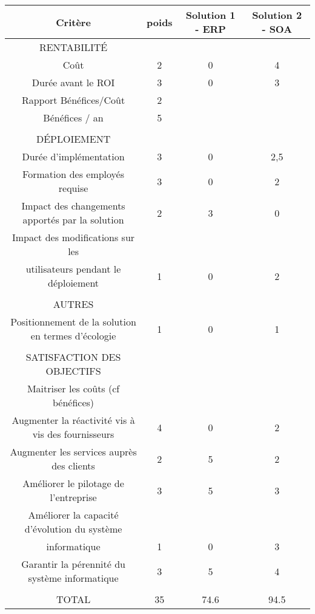 \begin{tabular}{|c|c|c|c|} 
\hline
\rowcolor{EnTete} Critère & poids & Solution 1 - ERP & Solution 2 - SOA \\ \hline
\rowcolor{Activite} RENTABILITÉ &  &  & \\ \hline
Coût & 2 & 0 & 4 \\ \hline
Durée avant le ROI & 3 & 0 & 3 \\ \hline
Rapport Bénéfices/Coût & 2 &  &  \\ \hline
Bénéfices / an & 5 &  &  \\ \hline
 &  &  &  \\ \hline
\rowcolor{Activite} DÉPLOIEMENT &  &  &  \\ \hline
Durée d'implémentation & 3 & 0 & 2,5  \\ \hline
Formation des employés requise & 3 & 0 & 2 \\ \hline
Impact des changements apportés par la solution & 2 & 3 & 0 \\ \hline
Impact des modifications sur les &  &  &  \\
utilisateurs pendant le déploiement & 1 & 0 & 2 \\ \hline
 &  &  &  \\ \hline
\rowcolor{Activite} AUTRES &  &  &  \\ \hline
Positionnement de la solution en termes d'écologie & 1 & 0 & 1 \\ \hline
 &  &  &  \\ \hline
\rowcolor{Activite} SATISFACTION DES OBJECTIFS &  &  & \\ \hline 
Maitriser les coûts (cf bénéfices) &  &  & \\ \hline
Augmenter la réactivité vis à vis des fournisseurs & 4 & 0 & 2 \\ \hline
 Augmenter les services auprès des clients & 2 & 5 & 2 \\ \hline
Améliorer le pilotage de l’entreprise & 3 & 5 & 3 \\ \hline
Améliorer la capacité d’évolution du système  &  &  &  \\
informatique & 1 & 0 & 3 \\ \hline 
Garantir la pérennité du système informatique & 3 & 5 & 4 \\ \hline
 &  &  &  \\ \hline
\rowcolor{Total}TOTAL & 35 & 74.6 & 94.5 \\ \hline

\end{tabular}